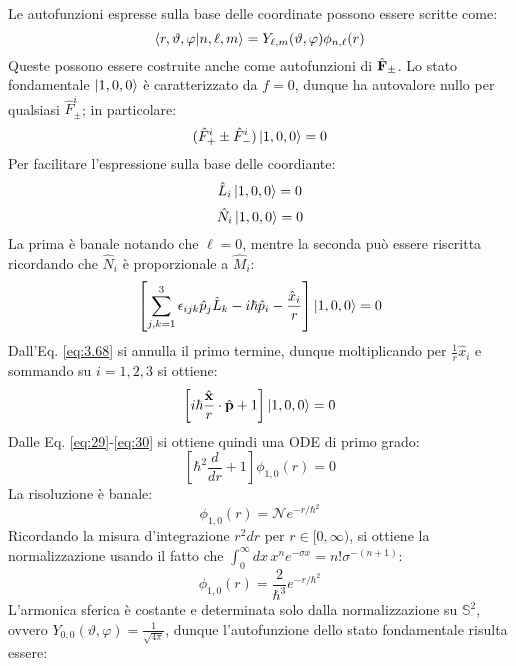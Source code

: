 Le autofunzioni espresse sulla base delle coordinate possono essere scritte come:
\begin{equation}
	\braket{r,\vartheta,\varphi | n,\ell,m} = Y_{\ell,m}(\vartheta,\varphi) \phi_{n,\ell}(r)
	\label{eq:3.66}
\end{equation}
Queste possono essere costruite anche come autofunzioni di $ \hat{\mathbf{F}}_{\pm} $. Lo stato fondamentale $ \ket{1,0,0} $ è caratterizzato da $ f = 0 $, dunque ha autovalore nullo per qualsiasi $ \hat{F}_{\pm}^i $; in particolare:
\begin{equation}
	(\hat{F}_+^i \pm \hat{F}_-^i) \ket{1,0,0} = 0
	\label{eq:3.67}
\end{equation}
Per facilitare l'espressione sulla base delle coordiante:
\begin{equation}
	\hat{L}_i \ket{1,0,0} = 0
	\label{eq:3.68}
\end{equation}
\begin{equation}
	\hat{N}_i \ket{1,0,0} = 0
	\label{eq:3.69}
\end{equation}
La prima è banale notando che $ \ell = 0 $, mentre la seconda può essere riscritta ricordando che $ \hat{N}_i $ è proporzionale a $ \hat{M}_i $:
\begin{equation*}
	\left[ \sum_{j,k = 1}^{3} \epsilon_{ijk} \hat{p}_j \hat{L}_k - i\hbar \hat{p}_i - \frac{\hat{x}_i}{r} \right] \ket{1,0,0} = 0
\end{equation*}
Dall'Eq. \ref{eq:3.68} si annulla il primo termine, dunque moltiplicando per $ \frac{1}{r} \hat{x}_i $ e sommando su $ i = 1,2,3 $ si ottiene:
\begin{equation*}
	\left[ i\hbar \frac{\hat{\mathbf{x}}}{r} \cdot \hat{\mathbf{p}} + 1 \right] \ket{1,0,0} = 0
\end{equation*}
Dalle Eq. \ref{eq:29}-\ref{eq:30} si ottiene quindi una ODE di primo grado:
\begin{equation*}
	\left[ \hbar^2 \frac{d}{dr} + 1 \right] \phi_{1,0}(r) = 0
\end{equation*}
La risoluzione è banale:
\begin{equation*}
	\phi_{1,0}(r) = \mathcal{N} e^{- r / \hbar^2}
\end{equation*}
Ricordando la misura d'integrazione $ r^2 dr $ per $ r \in [0,\infty) $, si ottiene la normalizzazione usando il fatto che $ \int_0^{\infty} dx\, x^n e^{-\sigma x} = n! \sigma^{-(n + 1)} $:
\begin{equation*}
	\phi_{1,0}(r) = \frac{2}{\hbar^3} e^{- r / \hbar^2}
\end{equation*}
L'armonica sferica è costante e determinata solo dalla normalizzazione su $ \mathbb{S}^2 $, ovvero $ Y_{0,0}(\vartheta,\varphi) = \frac{1}{\sqrt{4\pi}} $, dunque l'autofunzione dello stato fondamentale risulta essere:
